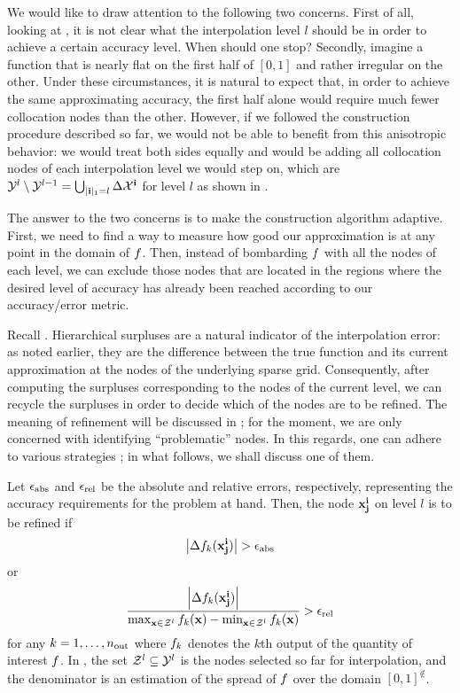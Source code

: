 We would like to draw attention to the following two concerns. First of all,
looking at , it is not clear what the interpolation
level $l$ should be in order to achieve a certain accuracy level. When should
one stop? Secondly, imagine a function that is nearly flat on the first half of
$[0, 1]$ and rather irregular on the other. Under these circumstances, it is
natural to expect that, in order to achieve the same approximating accuracy, the
first half alone would require much fewer collocation nodes than the other.
However, if we followed the construction procedure described so far, we would
not be able to benefit from this anisotropic behavior: we would treat both sides
equally and would be adding all collocation nodes of each interpolation level we
would step on, which are $\mathcal{Y}^l \setminus \mathcal{Y}^{l - 1} = \bigcup_{|\mathbf{i}|_1 = l}
\Delta\mathcal{X}^{\mathbf{i}}$ for level $l$ as shown in .

The answer to the two concerns is to make the construction algorithm adaptive.
First, we need to find a way to measure how good our approximation is at any
point in the domain of $f$. Then, instead of bombarding $f$ with all the nodes
of each level, we can exclude those nodes that are located in the regions where
the desired level of accuracy has already been reached according to our
accuracy/error metric.

Recall . Hierarchical surpluses are a natural indicator
of the interpolation error: as noted earlier, they are the difference between
the true function and its current approximation at the nodes of the underlying
sparse grid. Consequently, after computing the surpluses corresponding to the
nodes of the current level, we can recycle the surpluses in order to decide
which of the nodes are to be refined. The meaning of refinement will be
discussed in ; for the moment, we are only concerned
with identifying ``problematic'' nodes. In this regards, one can adhere to
various strategies \cite{ma2009}; in what follows, we shall discuss one of them.

Let $\epsilon_{\text{abs}}$ and $\epsilon_{\text{rel}}$ be the absolute and relative
errors, respectively, representing the accuracy requirements for the problem at
hand. Then, the node $\mathbf{x}^{\mathbf{i}}_{\mathbf{j}}$ on level $l$ is to be refined if
\begin{equation} \elab{absolute-error}
  \left| \surplus_k(\vx^\vi_\vj) \right| > \error_\absolute
\end{equation}
or
\begin{equation} \elab{relative-error}
  \frac{\left| \surplus_k(\vx^\vi_\vj) \right|}{\max_{\vx \in \Z^l} \f_k(\vx) - \min_{\vx \in \Z^l} \f_k(\vx)} > \error_\relative
\end{equation}
for any $k = 1, \dots, {n_\text{out}}$ where $f_k$ denotes the $k$th output of the
quantity of interest $f$. In , the set $\mathcal{Z}^l \subseteq
\mathcal{Y}^l$ is the nodes selected so far for interpolation, and the denominator is an
estimation of the spread of $f$ over the domain $[0, 1]^\nin$.

